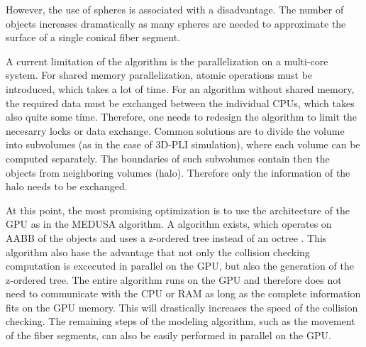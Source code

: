 However, the use of spheres is associated with a disadvantage.
The number of objects increases dramatically as many spheres are needed to approximate the surface of a single conical fiber segment.
\par
% 
A current limitation of the algorithm is the parallelization on a multi-core system.
For shared memory parallelization, atomic operations must be introduced, which takes a lot of time.
For an algorithm without shared memory, the required data must be exchanged between the individual CPUs, which takes also quite some time. 
Therefore, one needs to redesign the algorithm to limit the necesarry locks or data exchange.
Common solutions are to divide the volume into subvolumes (as in the case of \ac{3D-PLI} simulation), where each volume can be computed separately.
The boundaries of such subvolumes contain then the objects from neighboring volumes (halo).
Therefore only the information of the halo needs to be exchanged.
\par
% 
At this point, the most promising optimization is to use the architecture of the \ac{GPU} as \eg{} in the \ac{MEDUSA} algorithm.
A algorithm exists, which operates on \ac{AABB} of the objects and uses a z-ordered tree instead of an octree \cite{Karras2012}.
This algorithm also hase the advantage that not only the collision checking computation is excecuted in parallel on the \ac{GPU}, but also the generation of the z-ordered tree.
The entire algorithm runs on the \ac{GPU} and therefore does not need to communicate with the \ac{CPU} or \ac{RAM} as long as the complete information fits on the \ac{GPU} memory.
This will drastically increases the speed of the collision checking.
The remaining steps of the modeling algorithm, such as the movement of the fiber segments, can also be easily performed in parallel on the \ac{GPU}.
% 
% 
% 
